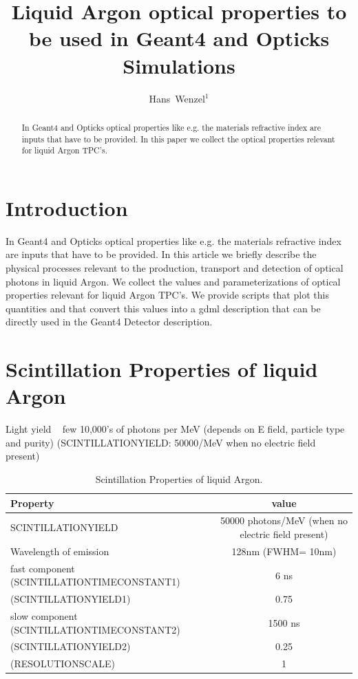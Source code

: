 \documentclass[a4paper]{jpconf}
\begin{document}
\title{Liquid Argon optical properties to be used in Geant4 and Opticks Simulations}

\author{ Hans~Wenzel$^1$}

\address{ $^1$~Fermilab PO Box 500, Batavia, IL 60510,
USA}


\begin{abstract}
  In Geant4 and Opticks optical properties like e.g. the materials refractive
  index are inputs that have to be provided. In this paper we collect the
  optical properties relevant for liquid Argon TPC's.   
\end{abstract}

\section{Introduction}
  In Geant4 and Opticks optical properties like e.g. the materials refractive
  index are inputs that have to be provided. In this article we briefly describe the physical processes relevant to the
  production, transport and detection of optical photons in liquid Argon. We collect the
  values and parameterizations of optical properties relevant for liquid Argon TPC's. We provide scripts that plot this quantities and that convert this values
  into a gdml description that can be directly used in the Geant4 Detector description.
  
  \section{Scintillation Properties of liquid Argon}
  Light yield ~ few 10,000’s of photons per MeV (depends on E field, particle type and purity)
(SCINTILLATIONYIELD: 50000/MeV when no electric field present)
  \begin{table}[h!]
  \begin{center}
    \label{tab:table1}
    \begin{tabular}{|l|c|} %
      \hline
      \textbf{Property} &       \textbf{value}\\
      \hline
      SCINTILLATIONYIELD & 50000 photons/MeV (when no electric field present)\\
      Wavelength of emission &  128nm (FWHM= 10nm)\\
      fast component  (SCINTILLATIONTIMECONSTANT1)& 6 ns\\  
      (SCINTILLATIONYIELD1)& 0.75 \\
      slow component (SCINTILLATIONTIMECONSTANT2)& 1500 ns \\
      (SCINTILLATIONYIELD2)& 0.25\\
      (RESOLUTIONSCALE)& 1\\
      \hline
    \end{tabular}
  \end{center}
  \caption{Scintillation Properties of liquid Argon.}
  \end{table}
  
\end{document}
